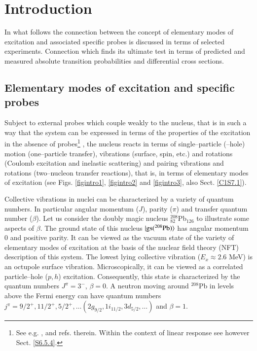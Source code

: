\chapter{Introduction}\label{intro}












In what follows the connection between the concept of elementary modes of excitation and associated specific probes is discussed in terms of selected experiments. Connection which finds its ultimate test in terms of predicted and measured absolute transition probabilities and differential cross sections. 
 \section{Elementary modes of excitation and specific probes}\label{S1.1}
Subject to external probes which couple weakly to the nucleus, that is in such a way that the system can be expressed in terms of the properties of the excitation in the absence of probes\footnote{See e.g. \cite{Pines:66},\cite{Bohr:75} and refs. therein. Within the context of linear response see however Sect. \ref{S6.5.4}.} , the nucleus reacts  in terms  of single--particle (--hole) motion (one--particle transfer), vibrations (surface, spin, etc.) and rotations (Coulomb excitation and inelastic scattering) and pairing vibrations and rotations (two--nucleon transfer reactions), that is, in terms of elementary modes of excitation (see Figs. \ref{figintro1}, \ref{figintro2} and \ref{figintro3}, also Sect. \ref{C1S7.1}).


Collective vibrations in nuclei can be characterized by a variety of quantum numbers. In particular angular momentum ($J$), parity ($\pi$) and transfer quantum number ($\beta$). Let us consider the doubly magic nucleus $^{208}_{82}$Pb$_{126}$ to illustrate some aspects of $\beta$. The ground state of this nucleus $|{\text{gs}(^{208}\text{Pb})} \rangle$ has angular momentum 0 and positive parity. It can be viewed as the vacuum state of the variety of elementary modes of excitation at the basis of the nuclear field theory (NFT) description of this system. The lowest lying collective vibration ($E_x\approx2.6$ MeV) is an octupole surface vibration. Microscopically, it can be viewed as a correlated particle--hole ($p,h$) excitation. Consequently, this state is characterized by the quantum numbers $J^\pi=3^-$, $\beta=0$. A neutron moving around $^{208}$Pb in levels above the Fermi energy can have quantum numbers $j^\pi=9/2^+,11/2^+,5/2^+,\dots(2g_{9/2},1i_{11/2},3d_{5/2},\dots)$ and $\beta=1$.


